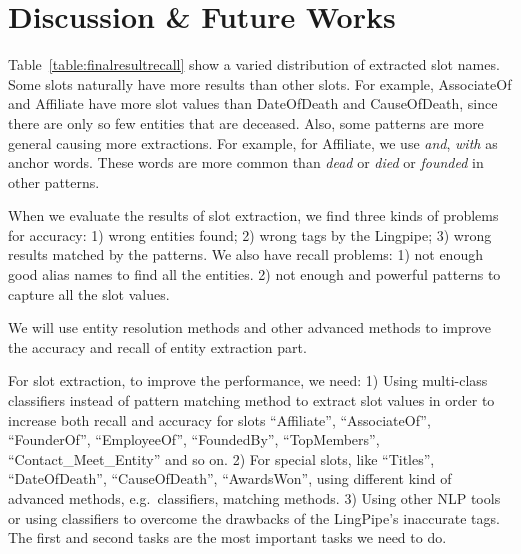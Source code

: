 

\section{Discussion \& Future Works}


Table~\ref{table:finalresultrecall} show a varied distribution of 
extracted slot names.
Some slots naturally have more results than other slots. For example,
AssociateOf and Affiliate have more slot values than DateOfDeath and
CauseOfDeath, since there are only so few entities that are deceased.
Also, some patterns are more general causing more extractions.
For example, for Affiliate, we use \textit{and},
\textit{with} as anchor words. These words are more common than \textit{dead} or \textit{died} or \textit{founded} in other patterns. 







When we evaluate the results of slot extraction, we find 
three kinds of problems for accuracy: 1) wrong entities found; 2) wrong tags 
by the Lingpipe; 3) wrong results matched by the patterns.  We also have 
recall problems: 1) not enough good alias names to find all the entities. 2) 
not enough and powerful patterns to capture all the slot values. 

We will use entity resolution methods and other advanced methods to improve 
the accuracy and recall of entity extraction part. 

For slot extraction, to improve the performance, we need: 1) Using multi-class classifiers instead of pattern matching method to 
extract slot values in order to increase both recall and accuracy for slots
``Affiliate'', ``AssociateOf'', ``FounderOf'', ``EmployeeOf'', ``FoundedBy'',
``TopMembers'', ``Contact\_Meet\_Entity'' and so on. 2) For special slots, 
like ``Titles'', ``DateOfDeath'', ``CauseOfDeath'', ``AwardsWon'', using different 
kind of advanced methods, e.g.\ classifiers, matching methods. 3) Using other 
NLP tools or using classifiers to overcome the drawbacks of the LingPipe’s 
inaccurate tags. The first and second tasks are the most important tasks we 
need to do.

